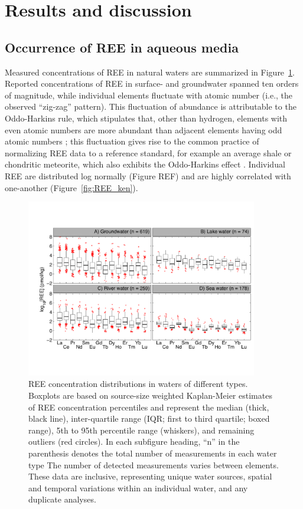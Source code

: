 \section{Results and discussion}

\subsection{Occurrence of REE in aqueous media}

Measured concentrations of REE in natural waters are summarized in Figure~\ref{fig:all_waters}.
Reported concentrations of REE in surface- and groundwater spanned ten orders of magnitude, while individual elements fluctuate with atomic number (i.e., the observed ``zig-zag'' pattern).
This fluctuation of abundance is attributable to the Oddo-Harkins rule, which stipulates that, other than hydrogen, elements with even atomic numbers are more abundant than adjacent elements having odd atomic numbers \citep{Harkins};
this fluctuation gives rise to the common practice of normalizing REE data to a reference standard, for example an average shale or chondritic meteorite, which also exhibits the Oddo-Harkins effect \citep{McLennan_GCA_1994}.
Individual REE are distributed log normally (Figure REF) and are highly correlated with one-another (Figure~\ref{fig:REE_ken}).

\begin{figure}
\begin{center}
\includegraphics[width=0.9\textwidth]{Ch3_figures/REE-water-boxplot.pdf}
\caption{REE concentration distributions in waters of different types.
Boxplots are based on source-size weighted Kaplan-Meier estimates of REE concentration percentiles and represent the median (thick, black line), inter-quartile range (IQR; first to third quartile; boxed range), 5th to 95th percentile range (whiskers), and remaining outliers (red circles).
In each subfigure heading, ``n'' in the parenthesis denotes the total number of measurements in each water type The number of detected measurements varies between elements.
These data are inclusive, representing unique water sources, spatial and temporal variations within an individual water, and any duplicate analyses.}\label{fig:all_waters}
\end{center}
\end{figure}


